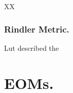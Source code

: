 \documentclass{article}      %
\newcommand{\LL}[0]{\mathcal{L}}
\newcommand{\dotOmega}[0]{\dot{\Omega}}
\newcommand{\CC}[0]{c^2}
\newcommand{\tdot}[0]{\dot{t}}
\newcommand{\rdot}[0]{\dot{r}}
\begin{document}
XX
\subsubsection{ Rindler Metric. }

Lut described the 

\section{ EOMs. }

%


%
%
%
%
%
\end{document}
